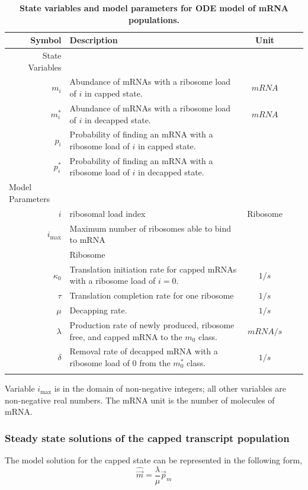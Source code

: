 \documentclass[10pt,letterpaper]{article}
\newcommand{\imax}{\ensuremath{{i_{\max}}}\xspace}
\newcommand{\mvec}{\ensuremath{\vec{m}}\xspace}
\newcommand{\mvechat}{\ensuremath{\hat{\mvec}}\xspace}
\begin{document}
\begin{table}[!ht]
\begin{adjustwidth}{-2.25in}{0in} 
\centering
\caption{{\bf State variables and model parameters for ODE model of mRNA populations.}}
\begin{tabular}{|rp{4in}|c|c|c|}
\hline
\textbf{Symbol}&\textbf{Description}&\textbf{Unit} \\\hline
State Variables & &  \\ 
\hline
$m_i$ & Abundance of mRNAs with a ribosome load of $i$ in capped state. & $mRNA$ \\
$m_i^*$ & Abundance of mRNAs with a ribosome load of $i$ in decapped state. & $mRNA$ \\ \hline
$p_i$ & Probability of finding an mRNA with a ribosome load of $i$ in capped state. & \\
$p_i^*$ & Probability of finding an mRNA with a ribosome load of $i$ in decapped state. &  \\ \hline
\multicolumn{1}{l}{Model Parameters} \\ \hline
$i$ & ribosomal load index & Ribosome\\
 \imax & Maximum number of ribosomes able to bind to mRNA\\ & Ribosome \\
$\kappa_0$ & Translation initiation rate for capped mRNAs with a ribosome load of $i=0$. & $1/s$\\
$\tau$ & Translation completion rate for one ribosome & $1/s$\\
$\mu $ & Decapping rate. & $1/s$\\
$\lambda$ & Production rate of newly produced, ribosome free, and capped mRNA to the $m_0$ class. & $mRNA/s$\\
$\delta$ & Removal rate of decapped mRNA with a ribosome load of 0 from the $m_0^*$ class. & $1/s$\\ \hline 
  \\ \hline
\end{tabular}
\begin{flushleft}
Variable \imax is in the domain of non-negative integers; all other variables are non-negative real numbers.
The mRNA unit is the number of molecules of mRNA.
\end{flushleft}
\label{tab:params}
\end{adjustwidth}
\end{table}


\subsubsection*{Steady state solutions of the capped transcript population}
 The model solution for the capped state can be represented in the following form,
	\begin{equation} \label{eq:capped_solution}
		\mvechat=\frac{\lambda}{\mu}\vec{p}_m
	\end{equation}
\end{document}
